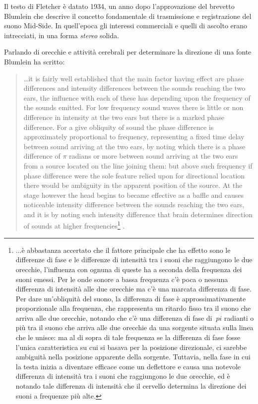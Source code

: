 Il testo di Fletcher \cite{hf34} è datato 1934, un anno dopo l'approvazione
del brevetto Blumlein che descrive il concetto fondamentale di trasmissione e
registrazione del suono Mid-Side. In quell'epoca gli interessi commerciali e
quelli di ascolto erano intrecciati, in una forma \emph{stereo} solida.

Parlando di orecchie e attività cerebrali per determinare la direzione di una
fonte Blumlein ha scritto:

\begin{quotation}
…it is fairly well established that the main factor having effect are phase
differences and intensity differences between the sounds reaching the two ears,
the influence with each of these has depending upon the frequency of the sounds
emitted. For low frequency sound waves there is little or non difference in
intensity at the two ears but there is a marked phase difference. For a give
obliquity of sound the phase difference is approximately proportional to
frequency, representing a fixed time delay between sound arriving at the two
ears, by noting which there is a phase difference of $\pi$ radians or more
between sound arriving at the two ears from a source located on the line joining
them: but above such frequency if phase difference were the sole feature relied
upon for directional location there would be ambiguity in the apparent position
of the source. At the stage however the head begins to became effective as a
baffle and causes noticeable intensity difference between the sounds reaching
the two ears, and it is by noting such intensity difference that brain
determines direction of sounds at higher frequencies\footnote{...è abbastanza accertato che il fattore principale che ha effetto sono le differenze di fase e le differenze di intensità tra i suoni che raggiungono le due orecchie, l'influenza con ognuna di queste ha a seconda della frequenza dei suoni emessi. Per le onde sonore a bassa frequenza c'è poca o nessuna differenza di intensità alle due orecchie ma c'è una marcata differenza di fase. Per dare un'obliquità del suono, la differenza di fase è approssimativamente proporzionale alla frequenza, che rappresenta un ritardo fisso tra il suono che arriva alle due orecchie, notando che c'è una differenza di fase di $ \ pi $ radianti o più tra il suono che arriva alle due orecchie da una sorgente situata sulla linea che le unisce: ma al di sopra di tale frequenza se la differenza di fase fosse l'unica caratteristica su cui si basava per la posizione direzionale, ci sarebbe ambiguità nella posizione apparente della sorgente. Tuttavia, nella fase in cui la testa inizia a diventare efficace come un deflettore e causa una notevole differenza di intensità tra i suoni che raggiungono le due orecchie, ed è notando tale differenza di intensità che il cervello determina la direzione dei suoni a frequenze più alte.} .\cite{ab58}
\end{quotation}


